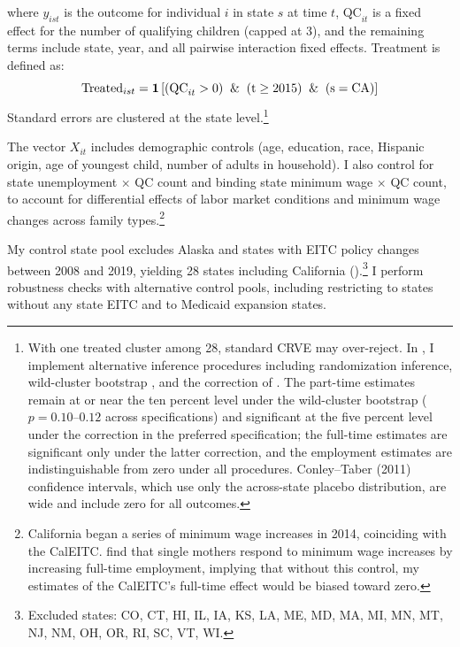 \documentclass[11pt]{article}
\let\Cref\crtCref
\begin{document}
where $y_{ist}$ is the outcome for individual $i$ in state $s$ at time $t$, $\text{QC}_{it}$ is a fixed effect for the number of qualifying children (capped at 3), and the remaining terms include state, year, and all pairwise interaction fixed effects. Treatment is defined as:
%
\begin{equation}
\label{eq:eq2}
\text{Treated}_{ist} = \textbf{1} \left [ (\text{QC}_{it} > 0) \And (\text{t} \geq 2015) \And (\text{s} = \text{CA})  \right ]
\end{equation}
%
Standard errors are clustered at the state level.\footnote{With one treated cluster among 28, standard CRVE may over-reject. In \Cref{sec:app_inf}, I implement alternative inference procedures including randomization inference, wild-cluster bootstrap \citep{cameron_bootstrap-based_2008}, and the correction of \cite{ferman_inference_2019}. The part-time estimates remain at or near the ten percent level under the wild-cluster bootstrap ($p = 0.10$--$0.12$ across specifications) and significant at the five percent level under the \cite{ferman_inference_2019} correction in the preferred specification; the full-time estimates are significant only under the latter correction, and the employment estimates are indistinguishable from zero under all procedures. Conley--Taber (2011) confidence intervals, which use only the across-state placebo distribution, are wide and include zero for all outcomes.}


The vector $X_{it}$ includes demographic controls (age, education, race, Hispanic origin, age of youngest child, number of adults in household). I also control for state unemployment $\times$ QC count and binding state minimum wage $\times$ QC count, to account for differential effects of labor market conditions and minimum wage changes across family types.\footnote{California began a series of minimum wage increases in 2014, coinciding with the CalEITC. \cite{godoy_parental_2024} find that single mothers respond to minimum wage increases by increasing full-time employment, implying that without this control, my estimates of the CalEITC's full-time effect would be biased toward zero.}


My control state pool excludes Alaska and states with EITC policy changes between 2008 and 2019, yielding 28 states including California (\Cref{tab:state_tab}).\footnote{Excluded states: CO, CT, HI, IL, IA, KS, LA, ME, MD, MA, MI, MN, MT, NJ, NM, OH, OR, RI, SC, VT, WI.} I perform robustness checks with alternative control pools, including restricting to states without any state EITC and to Medicaid expansion states.
\end{document}
